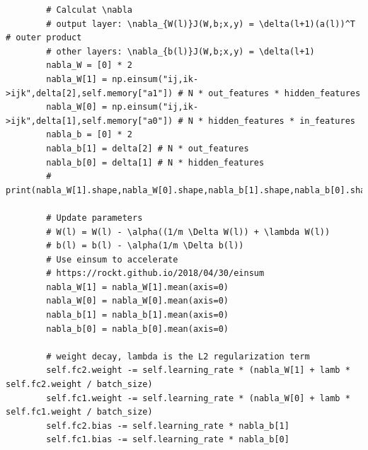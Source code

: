 \documentclass[a4paper, 11pt]{article}
\begin{document}
\begin{lstlisting}
        # Calculat \nabla
        # output layer: \nabla_{W(l)}J(W,b;x,y) = \delta(l+1)(a(l))^T # outer product
        # other layers: \nabla_{b(l)}J(W,b;x,y) = \delta(l+1)
        nabla_W = [0] * 2
        nabla_W[1] = np.einsum("ij,ik->ijk",delta[2],self.memory["a1"]) # N * out_features * hidden_features
        nabla_W[0] = np.einsum("ij,ik->ijk",delta[1],self.memory["a0"]) # N * hidden_features * in_features
        nabla_b = [0] * 2
        nabla_b[1] = delta[2] # N * out_features
        nabla_b[0] = delta[1] # N * hidden_features
        # print(nabla_W[1].shape,nabla_W[0].shape,nabla_b[1].shape,nabla_b[0].shape)

        # Update parameters
        # W(l) = W(l) - \alpha((1/m \Delta W(l)) + \lambda W(l))
        # b(l) = b(l) - \alpha(1/m \Delta b(l))
        # Use einsum to accelerate
        # https://rockt.github.io/2018/04/30/einsum
        nabla_W[1] = nabla_W[1].mean(axis=0)
        nabla_W[0] = nabla_W[0].mean(axis=0)
        nabla_b[1] = nabla_b[1].mean(axis=0)
        nabla_b[0] = nabla_b[0].mean(axis=0)

        # weight decay, lambda is the L2 regularization term
        self.fc2.weight -= self.learning_rate * (nabla_W[1] + lamb * self.fc2.weight / batch_size)
        self.fc1.weight -= self.learning_rate * (nabla_W[0] + lamb * self.fc1.weight / batch_size)
        self.fc2.bias -= self.learning_rate * nabla_b[1]
        self.fc1.bias -= self.learning_rate * nabla_b[0]
\end{lstlisting}
\end{document}
